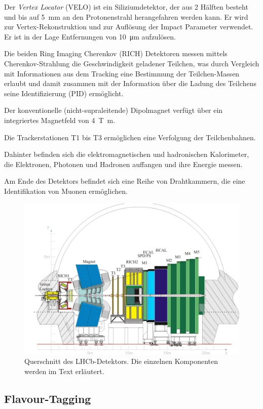 Der \emph{Vertex Locator} (VELO) ist ein Siliziumdetektor, der aus 2 Hälften besteht und bis auf \SI{5}{\milli\metre} an den Protonenstrahl herangefahren werden kann. Er wird zur Vertex-Rekonstruktion und zur Auflösung der Impact Parameter verwendet. Er ist in der Lage Entfernungen von \SI{10}{\micro\metre} aufzulösen.

Die beiden Ring Imaging Cherenkov (RICH) Detektoren messen mittels Cherenkov-Strahlung die Geschwindigkeit geladener Teilchen, was durch Vergleich mit Informationen aus dem Tracking eine Bestimmung der Teilchen-Massen erlaubt und damit zusammen mit der Information über die Ladung des Teilchens seine Identifizierung (PID) ermöglicht.

Der konventionelle (nicht-supraleitende) Dipolmagnet verfügt über ein integriertes Magnetfeld von \SI{4}{\tesla\metre}.

Die Trackerstationen T1 bis T3 ermöglichen eine Verfolgung der Teilchenbahnen.

Dahinter befinden sich die elektromagnetischen und hadronischen Kalorimeter, die Elektronen, Photonen und Hadronen auffangen und ihre Energie messen.

Am Ende des Detektors befindet sich eine Reihe von Drahtkammern, die eine Identifikation von Muonen ermöglichen.

\begin{figure}
  \includegraphics[width=\textwidth]{figures/lhcb.pdf}
  \caption{Querschnitt des LHCb-Detektors. Die einzelnen Komponenten werden im Text erläutert.\cite{lhcb}}
  \label{lhcb}
\end{figure}

\subsection{Flavour-Tagging}

